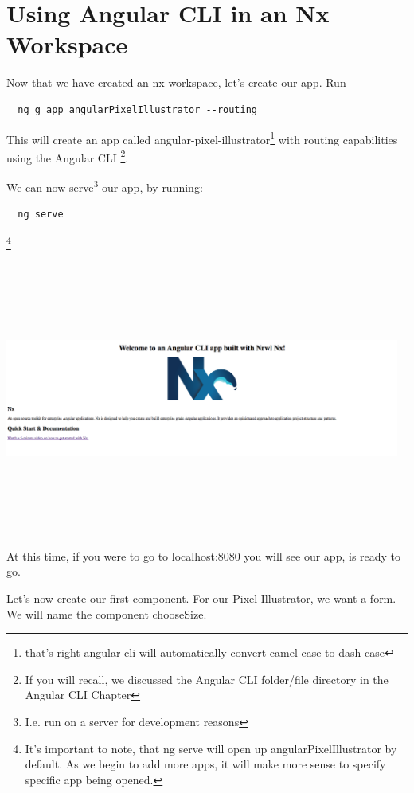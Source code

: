 \maketitle{}
\section{ Using Angular CLI in an Nx Workspace }

Now that we have created an nx workspace, let's create our app. Run
\begin{verbatim}
  ng g app angularPixelIllustrator --routing
\end{verbatim}

This will create an app called angular-pixel-illustrator\footnote{that's right
angular cli will automatically convert camel case to dash case} with routing
capabilities using the Angular CLI \footnote{If you will recall, we discussed
the Angular CLI folder/file directory in the Angular CLI Chapter}.

We can now serve\footnote{I.e. run on a server for development reasons} our app,
by running:
\begin{verbatim}
  ng serve
\end{verbatim}
\footnote{It's important to note, that ng serve will open up
angularPixelIllustrator by default. As we begin to add more apps, it will make
more sense to specify specific app being opened.}

\includegraphics[width=13cm, height=9cm]{angular-cli-post-nx/angular_nx_initial_screen}

At this time, if you were to go to localhost:8080 you will see our app, is
ready to go.

Let's now create our first component. For our Pixel Illustrator, we want a form.
We will name the component chooseSize.

